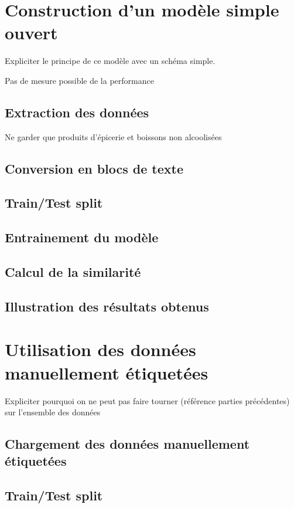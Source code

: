 \documentclass{report}
\begin{document}
    \chapter{Construction d'un modèle simple \og ouvert \fg}
        
    Expliciter le principe de ce modèle avec un schéma simple.

    Pas de mesure possible de la performance

        \section{Extraction des données}

        Ne garder que produits d'épicerie et boissons non alcoolisées

        \section{Conversion en blocs de texte}
        \section{Train/Test split}
        \section{Entrainement du modèle}
        \section{Calcul de la similarité}
        \section{Illustration des résultats obtenus}
    
    \chapter{Utilisation des données manuellement étiquetées}

    Expliciter pourquoi on ne peut pas faire tourner (référence parties précédentes) sur l'ensemble des données
        
        \section{Chargement des données manuellement étiquetées}

        \section{Train/Test split}
\end{document}
